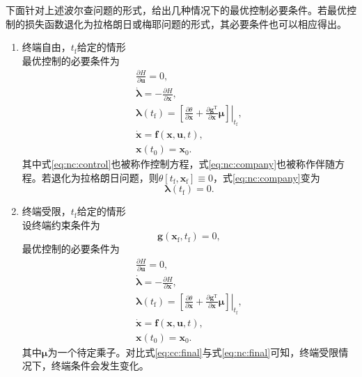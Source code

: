 下面针对上述波尔查问题的形式，给出几种情况下的最优控制必要条件。若最优控制的损失函数退化为拉格朗日或梅耶问题的形式，其必要条件也可以相应得出。
\\
\begin{enumerate}
\item {\heiti 终端自由，$t_\mathrm{f}$给定的情形}
\\ 最优控制的必要条件为
\begin{gather}
\frac{\partial H}{\partial\bm{u}}=0,\label{eq:nc:control}\\
\dot{\bm{\lambda}}=-\frac{\partial H}{\partial\bm{x}},\label{eq:nc:company}\\
\bm{\lambda}(t_\mathrm{f})=\left. \left[\frac{\partial \theta}{\partial \bm{x}}+\frac{\partial \bm{g}^\mathrm{T}}{\partial \bm{x}}\bm{\mu}\right]\right|_{t_\mathrm{f}},\label{eq:nc:final}\\
\dot{\bm{x}}=\bm{f}(\bm{x},\bm{u},t),\\
\bm{x}(t_0)=\bm{x}_0.\label{eq:nc:last}
\end{gather}
其中式\ref{eq:nc:control}也被称作{\heiti 控制方程}，式\ref{eq:nc:company}也被称作{\heiti 伴随方程}。若退化为拉格朗日问题，则$\theta[t_\mathrm{f},\bm{x}_\mathrm{f}]\equiv 0$，式\ref{eq:nc:company}变为
\begin{equation}
\bm{\lambda}(t_\mathrm{f})=0.
\end{equation}

\item {\heiti 终端受限，$t_\mathrm{f}$给定的情形}
\\设终端约束条件为
\begin{equation}
\bm{g}(\bm{x}_\mathrm{f},t_\mathrm{f})=0,
\end{equation}
最优控制的必要条件为
\begin{gather}
\frac{\partial H}{\partial\bm{u}}=0,\label{eq:cc:control}\\
\dot{\bm{\lambda}}=-\frac{\partial H}{\partial\bm{x}},\label{eq:cc:company}\\
\bm{\lambda}(t_\mathrm{f})=\left. [\frac{\partial \theta}{\partial \bm{x}}+\frac{\partial \bm{g}^\mathrm{T}}{\partial \bm{x}}\bm{\mu}]\right|_{t_\mathrm{f}},\label{eq:cc:final}\\
\dot{\bm{x}}=\bm{f}(\bm{x},\bm{u},t),\\
\bm{x}(t_0)=\bm{x}_0.\label{eq:cc:last}
\end{gather}
其中$\bm{\mu}$为一个待定乘子。对比式\ref{eq:cc:final}与式\ref{eq:nc:final}可知，终端受限情况下，终端条件会发生变化。


\end{enumerate}
